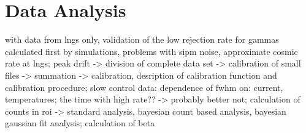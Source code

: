 \chapter{Data Analysis}
\label{chap:DataAnalysis}

with data from lngs only, validation of the low rejection rate for gammas calculated first by simulations, problems with sipm noise, approximate cosmic rate at lngs; peak drift -> division of complete data set -> calibration of small files -> summation -> calibration, desription of calibration function and calibration procedure; slow control data: dependence of fwhm on: current, temperatures; the time with high rate?? -> probably better not; calculation of counts in roi -> standard analysis, bayesian count based analysis, bayesian gaussian fit analysis; calculation of beta